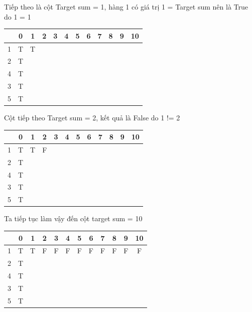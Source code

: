 \documentclass{article}
\begin{document}
    Tiếp theo là cột Target sum = 1, hàng 1 có giá trị 1 = Target sum nên là True do 1 = 1\\
    \begin{center}
        \begin{tabular}{|c|c|c|c|c|c|c|c|c|c|c|c|}
        \hline
        {}&{0}&{1}&{2}&{3}&{4}&{5}&{6}&{7}&{8}&{9}&{10}\\
        \hline
        1&T&T&&&&&&&&&\\
        \hline
        2&T&&&&&&&&&&\\
        \hline
        4&T&&&&&&&&&&\\
        \hline
        3&T&&&&&&&&&&\\
        \hline
        5&T&&&&&&&&&&\\
        \hline
    \end{tabular}
    \end{center}
    
    Cột tiếp theo Target sum = 2, kết quả là False do 1 != 2\\
    \begin{center}
        \begin{tabular}{|c|c|c|c|c|c|c|c|c|c|c|c|}
        \hline
        {}&{0}&{1}&{2}&{3}&{4}&{5}&{6}&{7}&{8}&{9}&{10}\\
        \hline
        1&T&T&F&&&&&&&&\\
        \hline
        2&T&&&&&&&&&&\\
        \hline
        4&T&&&&&&&&&&\\
        \hline
        3&T&&&&&&&&&&\\
        \hline
        5&T&&&&&&&&&&\\
        \hline
    \end{tabular}
    \end{center}
    
    Ta tiếp tục làm vậy đến cột target sum = 10\\
    \begin{center}
        \begin{tabular}{|c|c|c|c|c|c|c|c|c|c|c|c|}
        \hline
        {}&{0}&{1}&{2}&{3}&{4}&{5}&{6}&{7}&{8}&{9}&{10}\\
        \hline
        1&T&T&F&F&F&F&F&F&F&F&F\\
        \hline
        2&T&&&&&&&&&&\\
        \hline
        4&T&&&&&&&&&&\\
        \hline
        3&T&&&&&&&&&&\\
        \hline
        5&T&&&&&&&&&&\\
        \hline
    \end{tabular}
    \end{center}
    
\end{document}
